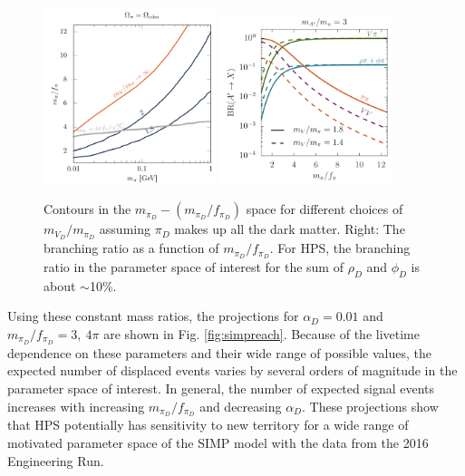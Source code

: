 \begin{figure}
    \centering
    \includegraphics[width=0.45\textwidth]{figs/upgrades/mpifpi.png}
    \includegraphics[width=0.45\textwidth]{figs/upgrades/simp_br.png}
    \caption{Contours in the $m_{\pi_D}-(m_{\pi_D}/f_{\pi_D})$ space for different choices of $m_{V_D}/m_{\pi_D}$ assuming $\pi_D$ makes up all the dark matter. Right: The branching ratio as a function of $m_{\pi_D}/f_{\pi_D}$. For HPS, the branching ratio in the parameter space of interest for the sum of $\rho_D$ and $\phi_D$ is about $\sim$10\%.}
    \label{fig:simpbr}
\end{figure}


Using these constant mass ratios, the projections for $\alpha_D=0.01$  and $m_{\pi_D}/f_{\pi_D}=3, \ 4\pi$ are shown in Fig. \ref{fig:simpreach}. Because of the livetime dependence on these parameters and their wide range of possible values, the expected number of displaced events varies by several orders of magnitude in the parameter space of interest. In general, the number of expected signal events increases with increasing $m_{\pi_D}/f_{\pi_D}$ and decreasing $\alpha_D$. These projections show that HPS potentially has sensitivity to new territory for a wide range of motivated parameter space of the SIMP model with the data from the 2016 Engineering Run.

